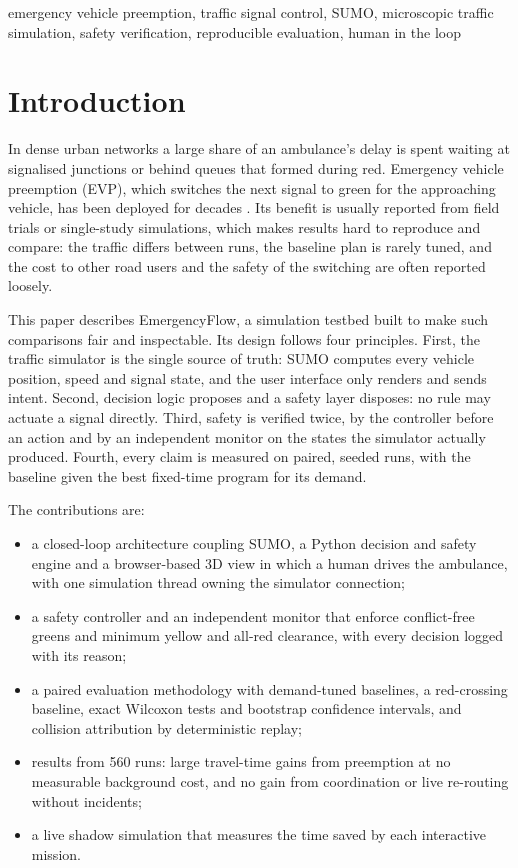 \documentclass[conference]{IEEEtran}
\begin{document}
\begin{IEEEkeywords}
emergency vehicle preemption, traffic signal control, SUMO, microscopic traffic simulation, safety verification, reproducible evaluation, human in the loop
\end{IEEEkeywords}

\section{Introduction}

In dense urban networks a large share of an ambulance's delay is spent waiting at signalised junctions or behind queues that formed during red. Emergency vehicle preemption (EVP), which switches the next signal to green for the approaching vehicle, has been deployed for decades \cite{fhwa_evp}. Its benefit is usually reported from field trials or single-study simulations, which makes results hard to reproduce and compare: the traffic differs between runs, the baseline plan is rarely tuned, and the cost to other road users and the safety of the switching are often reported loosely.

This paper describes EmergencyFlow, a simulation testbed built to make such comparisons fair and inspectable. Its design follows four principles. First, the traffic simulator is the single source of truth: SUMO \cite{sumo} computes every vehicle position, speed and signal state, and the user interface only renders and sends intent. Second, decision logic proposes and a safety layer disposes: no rule may actuate a signal directly. Third, safety is verified twice, by the controller before an action and by an independent monitor on the states the simulator actually produced. Fourth, every claim is measured on paired, seeded runs, with the baseline given the best fixed-time program for its demand.

The contributions are:
\begin{itemize}
\item a closed-loop architecture coupling SUMO, a Python decision and safety engine and a browser-based 3D view in which a human drives the ambulance, with one simulation thread owning the simulator connection;
\item a safety controller and an independent monitor that enforce conflict-free greens and minimum yellow and all-red clearance, with every decision logged with its reason;
\item a paired evaluation methodology with demand-tuned baselines, a red-crossing baseline, exact Wilcoxon tests and bootstrap confidence intervals, and collision attribution by deterministic replay;
\item results from 560 runs: large travel-time gains from preemption at no measurable background cost, and no gain from coordination or live re-routing without incidents;
\item a live shadow simulation that measures the time saved by each interactive mission.
\end{itemize}
\end{document}
